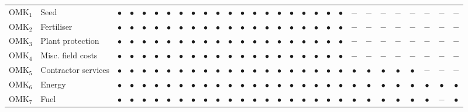 \documentclass[12pt]{article}
\begin{document}
\begin{table}[H]
\begin{threeparttable}
{\begin{tabular}{llccccccccccccccccccccccccccc}
OMK$_1$    & Seed                  & $\bullet$ & $\bullet$ & $\bullet$ & $\bullet$ & $\bullet$ & $\bullet$ & $\bullet$ & $\bullet$ & $\bullet$ & $\bullet$ & $\bullet$ & $\bullet$ & $\bullet$ & $\bullet$ & $\bullet$ & $\bullet$ & $\bullet$ & $\bullet$ & $\bullet$ & $-$ & $-$ & $-$ & $-$ & $-$ & $-$ & $-$ & $-$ \\
OMK$_2$    & Fertiliser            & $\bullet$ & $\bullet$ & $\bullet$ & $\bullet$ & $\bullet$ & $\bullet$ & $\bullet$ & $\bullet$ & $\bullet$ & $\bullet$ & $\bullet$ & $\bullet$ & $\bullet$ & $\bullet$ & $\bullet$ & $\bullet$ & $\bullet$ & $\bullet$ & $\bullet$ & $-$  & $-$  & $-$  & $-$  & $-$  & $-$  & $-$  & $-$  \\
OMK$_3$    & Plant protection       & $\bullet$ & $\bullet$ & $\bullet$ & $\bullet$ & $\bullet$ & $\bullet$ & $\bullet$ & $\bullet$ & $\bullet$ & $\bullet$ & $\bullet$ & $\bullet$ & $\bullet$ & $\bullet$ & $\bullet$ & $\bullet$ & $\bullet$ & $\bullet$ & $\bullet$ & $-$  & $-$  & $-$  & $-$  & $-$  & $-$  & $-$  & $-$  \\
OMK$_4$    & Misc. field costs      & $\bullet$ & $\bullet$ & $\bullet$ & $\bullet$ & $\bullet$ & $\bullet$ & $\bullet$ & $\bullet$ & $\bullet$ & $\bullet$ & $\bullet$ & $\bullet$ & $\bullet$ & $\bullet$ & $\bullet$ & $\bullet$ & $\bullet$ & $\bullet$ & $\bullet$ & $-$  & $-$  & $-$  & $-$  & $-$  & $-$  & $-$  & $-$  \\
OMK$_5$    & Contractor services    & $\bullet$ & $\bullet$ & $\bullet$ & $\bullet$ & $\bullet$ & $\bullet$ & $\bullet$ & $\bullet$ & $\bullet$ & $\bullet$ & $\bullet$ & $\bullet$ & $\bullet$ & $\bullet$ & $\bullet$ & $\bullet$ & $\bullet$ & $\bullet$ & $\bullet$ & $\bullet$ & $\bullet$ & $\bullet$ & $\bullet$ & $\bullet$ & $-$  & $-$  & $-$  \\
OMK$_6$    & Energy                 & $\bullet$ & $\bullet$ & $\bullet$ & $\bullet$ & $\bullet$ & $\bullet$ & $\bullet$ & $\bullet$ & $\bullet$ & $\bullet$ & $\bullet$ & $\bullet$ & $\bullet$ & $\bullet$ & $\bullet$ & $\bullet$ & $\bullet$ & $\bullet$ & $\bullet$ & $\bullet$ & $\bullet$ & $\bullet$ & $\bullet$ & $\bullet$ & $\bullet$ & $\bullet$ & $\bullet$ \\
OMK$_7$    & Fuel                   & $\bullet$ & $\bullet$ & $\bullet$ & $\bullet$ & $\bullet$ & $\bullet$ & $\bullet$ & $\bullet$ & $\bullet$ & $\bullet$ & $\bullet$ & $\bullet$ & $\bullet$ & $\bullet$ & $\bullet$ & $\bullet$ & $\bullet$ & $\bullet$ & $\bullet$ & $\bullet$ & $\bullet$ & $\bullet$ & $\bullet$ & $\bullet$ & $\bullet$ & $-$  & $\bullet$ \\

\end{tabular}}
\end{threeparttable}
\end{table}
\end{document}
